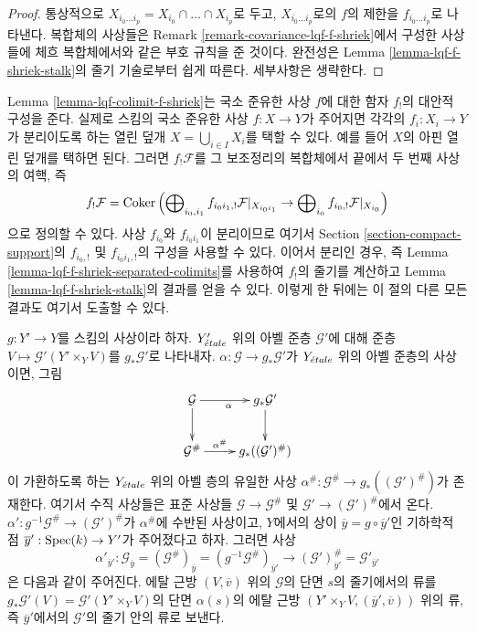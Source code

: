 \begin{proof}
통상적으로 $X_{i_0 \ldots i_p} = X_{i_0} \cap \ldots \cap X_{i_p}$로
두고, $X_{i_0 \ldots i_p}$로의 $f$의 제한을
$f_{i_0 \ldots i_p}$로 나타낸다. 복합체의 사상들은
Remark \ref{remark-covariance-lqf-f-shriek}에서 구성한 사상들에
체흐 복합체에서와 같은 부호 규칙을 준 것이다. 완전성은 Lemma
\ref{lemma-lqf-f-shriek-stalk}의 줄기 기술로부터 쉽게 따른다.
세부사항은 생략한다.
\end{proof}

\begin{remark}[대안적 구성]
\label{remark-alternative-lqf-f-shriek}
Lemma \ref{lemma-lqf-colimit-f-shriek}는 국소 준유한 사상 $f$에 대한
함자 $f_!$의 대안적 구성을 준다. 실제로 스킴의 국소 준유한 사상
$f : X \to Y$가 주어지면 각각의 $f_i : X_i \to Y$가 분리이도록
하는 열린 덮개 $X = \bigcup_{i \in I} X_i$를 택할 수 있다.
예를 들어 $X$의 아핀 열린 덮개를 택하면 된다. 그러면
$f_!\mathcal{F}$를 그 보조정리의 복합체에서 끝에서 두 번째
사상의 여핵, 즉
$$
f_!\mathcal{F} = \mathop{\mathrm{Coker}}\left(
\bigoplus\nolimits_{i_0, i_1} f_{i_0i_1, !} \mathcal{F}|_{X_{i_0i_1}} \to
\bigoplus\nolimits_{i_0} f_{i_0, !} \mathcal{F}|_{X_{i_0}}
\right)
$$
으로 정의할 수 있다. 사상 $f_{i_0}$와 $f_{i_0 i_1}$이 분리이므로
여기서 Section \ref{section-compact-support}의 $f_{i_0, !}$ 및
$f_{i_0i_1, !}$의 구성을 사용할 수 있다. 이어서 분리인 경우,
즉 Lemma \ref{lemma-lqf-f-shriek-separated-colimits}를 사용하여
$f_!$의 줄기를 계산하고 Lemma \ref{lemma-lqf-f-shriek-stalk}의
결과를 얻을 수 있다. 이렇게 한 뒤에는 이 절의 다른 모든 결과도
여기서 도출할 수 있다.
\end{remark}

\begin{remark}
\label{remark-construct-map-presheaves-downstairs}
$g : Y' \to Y$를 스킴의 사상이라 하자. $Y'_{\acute{e}tale}$ 위의 아벨 준층
$\mathcal{G}'$에 대해 준층 $V \mapsto \mathcal{G}'(Y' \times_Y V)$를
$g_*\mathcal{G}'$로 나타내자. $\alpha : \mathcal{G} \to g_*\mathcal{G}'$가
$Y_{\acute{e}tale}$ 위의 아벨 준층의 사상이면, 그림
$$
\xymatrix{
\mathcal{G} \ar[d] \ar[r]_\alpha & g_*\mathcal{G}' \ar[d] \\
\mathcal{G}^\# \ar[r]^-{\alpha^\#} & g_*((\mathcal{G}')^\#)
}
$$
이 가환하도록 하는 $Y_{\acute{e}tale}$ 위의 아벨 층의 유일한 사상
$\alpha^\# : \mathcal{G}^\# \to g_*((\mathcal{G}')^\#)$가 존재한다.
여기서 수직 사상들은 표준 사상들
$\mathcal{G} \to \mathcal{G}^\#$ 및
$\mathcal{G}' \to (\mathcal{G}')^\#$에서 온다.
$\alpha' : g^{-1}\mathcal{G}^\# \to (\mathcal{G}')^\#$가
$\alpha^\#$에 수반된 사상이고, $Y$에서의 상이
$\overline{y} = g \circ \overline{y}'$인 기하학적 점
$\overline{y}' : \mathop{\mathrm{Spec}}(k) \to Y'$가 주어졌다고 하자. 그러면 사상
$$
\alpha'_{\overline{y}'} :
\mathcal{G}_{\overline{y}} =
(\mathcal{G}^\#)_{\overline{y}} =
(g^{-1}\mathcal{G}^\#)_{\overline{y}'}
\longrightarrow
(\mathcal{G}')^\#_{\overline{y}'} =
\mathcal{G}'_{\overline{y}'}
$$
은 다음과 같이 주어진다. 에탈 근방 $(V, \overline{v})$ 위의
$\mathcal{G}$의 단면 $s$의 줄기에서의 류를
$g_*\mathcal{G}'(V) = \mathcal{G}'(Y' \times_Y V)$의 단면
$\alpha(s)$의 에탈 근방
$(Y' \times_Y V, (\overline{y}', \overline{v}))$ 위의 류, 즉
$\overline{y}'$에서의 $\mathcal{G}'$의 줄기 안의 류로 보낸다.
\end{remark}

